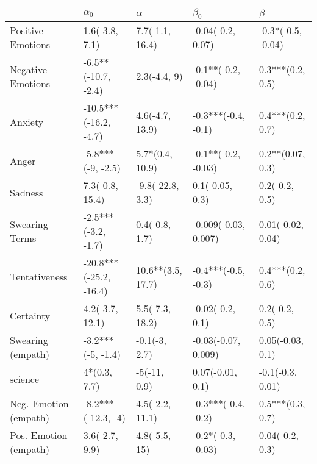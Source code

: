 \begin{tabular}{lllll}
\toprule
{} &              $\alpha_0$ &           $\alpha$ &             $\beta_0$ &             $\beta$ \\
\midrule
Positive Emotions     &          1.6(-3.8, 7.1) &    7.7(-1.1, 16.4) &     -0.04(-0.2, 0.07) &  -0.3*(-0.5, -0.04) \\
Negative Emotions     &     -6.5**(-10.7, -2.4) &       2.3(-4.4, 9) &   -0.1**(-0.2, -0.04) &    0.3***(0.2, 0.5) \\
Anxiety               &   -10.5***(-16.2, -4.7) &    4.6(-4.7, 13.9) &   -0.3***(-0.4, -0.1) &    0.4***(0.2, 0.7) \\
Anger                 &       -5.8***(-9, -2.5) &    5.7*(0.4, 10.9) &   -0.1**(-0.2, -0.03) &    0.2**(0.07, 0.3) \\
Sadness               &         7.3(-0.8, 15.4) &   -9.8(-22.8, 3.3) &       0.1(-0.05, 0.3) &      0.2(-0.2, 0.5) \\
Swearing Terms        &     -2.5***(-3.2, -1.7) &     0.4(-0.8, 1.7) &  -0.009(-0.03, 0.007) &   0.01(-0.02, 0.04) \\
Tentativeness         &  -20.8***(-25.2, -16.4) &  10.6**(3.5, 17.7) &   -0.4***(-0.5, -0.3) &    0.4***(0.2, 0.6) \\
Certainty             &         4.2(-3.7, 12.1) &    5.5(-7.3, 18.2) &      -0.02(-0.2, 0.1) &      0.2(-0.2, 0.5) \\
Swearing (empath)     &       -3.2***(-5, -1.4) &      -0.1(-3, 2.7) &   -0.03(-0.07, 0.009) &    0.05(-0.03, 0.1) \\
science               &            4*(0.3, 7.7) &       -5(-11, 0.9) &      0.07(-0.01, 0.1) &    -0.1(-0.3, 0.01) \\
Neg. Emotion (empath) &      -8.2***(-12.3, -4) &    4.5(-2.2, 11.1) &   -0.3***(-0.4, -0.2) &    0.5***(0.3, 0.7) \\
Pos. Emotion (empath) &          3.6(-2.7, 9.9) &      4.8(-5.5, 15) &    -0.2*(-0.3, -0.03) &     0.04(-0.2, 0.3) \\
\bottomrule
\end{tabular}
